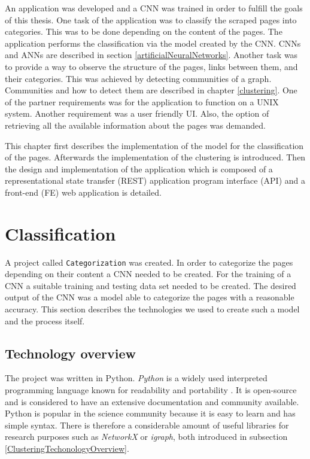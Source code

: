 \label{developmentIntroduction}
An application was developed and a CNN was trained in order to fulfill the goals of this thesis. One task of the application was to classify the scraped pages into categories. This was to be done depending on the content of the pages. The application performs the classification via the model created by the CNN. CNNs and ANNs are described in section \ref{artificialNeuralNetworks}. Another task was to provide a way to observe the structure of the pages, links between them, and their categories. This was achieved by detecting communities of a graph. Communities and how to detect them are described in chapter \ref{clustering}. One of the partner requirements was for the application to function on a UNIX system. Another requirement was a user friendly UI. Also, the option of retrieving all the available information about the pages was demanded. 

This chapter first describes the implementation of the model for the classification of the pages. Afterwards the implementation of the clustering is introduced. Then the design and implementation of the application which is composed of a representational state transfer (REST) application program interface (API) and a front-end (FE) web application is detailed. 

\section{Classification} \label{ClassificationDevelopment}
A project called \texttt{Categorization} was created. In order to categorize the pages depending on their content a CNN needed to be created. For the training of a CNN a suitable training and testing data set needed to be created. The desired output of the CNN was a model able to categorize the pages with a reasonable accuracy. This section describes the technologies we used to create such a model and the process itself.

\subsection{Technology overview} \label{ClassificationTechonologyOverview}
The project was written in Python. \textit{Python} is a widely used interpreted programming language known for readability and portability \cite{aboutPython}. It is open-source and is considered to have an extensive documentation and community available. Python is popular in the science community because it is easy to learn and has simple syntax. There is therefore a considerable amount of useful libraries for research purposes such as \textit{NetworkX} or \textit{igraph}, both introduced in subsection \ref{ClusteringTechonologyOverview}.  

